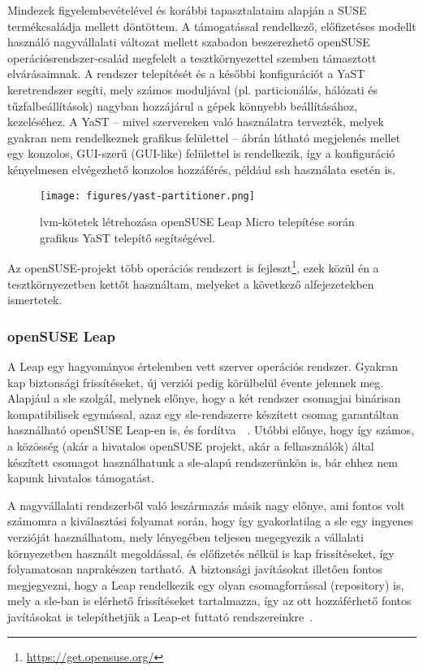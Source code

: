 Mindezek figyelembevételével és korábbi tapasztalataim alapján a SUSE termékcsaládja mellett döntöttem. A támogatással rendelkező, előfizetéses modellt használó nagyvállalati változat mellett szabadon beszerezhető openSUSE operációsrendszer-család megfelelt a tesztkörnyezettel szemben támasztott elvárásaimnak. A rendszer telepítését és a későbbi konfigurációt a YaST keretrendszer segíti, mely számos moduljával (pl. particionálás, hálózati és tűzfalbeállítások) nagyban hozzájárul a gépek könnyebb beállításához, kezeléséhez. A YaST -- mivel szervereken való használatra tervezték, melyek gyakran nem rendelkeznek grafikus felülettel --  ábrán látható megjelenés mellet egy konzolos, GUI-szerű (GUI-like) felülettel is rendelkezik, így a konfiguráció kényelmesen elvégezhető konzolos hozzáférés, például \acrshort{ssh} használata esetén is.

\begin{figure}[!ht]
	\centering
	\texttt{[image: figures/yast-partitioner.png]}
	\caption{\acrshort{lvm}-kötetek létrehozása openSUSE Leap Micro telepítése során grafikus YaST telepítő segítségével.}
	\label{fig:yast-partitioner}
\end{figure}

Az openSUSE-projekt több operációs rendszert is fejleszt\footnote{\url{https://get.opensuse.org/}}, ezek közül én a tesztkörnyezetben kettőt használtam, melyeket a következő alfejezetekben ismertetek.

\subsubsection{openSUSE Leap}
A Leap egy hagyományos értelemben vett szerver operációs rendszer. Gyakran kap biztonsági frissítéseket, új verziói pedig körülbelül évente jelennek meg. Alapjául a \acrlong{sle} szolgál, melynek előnye, hogy a két rendszer csomagjai binárisan kompatibilisek egymással, azaz egy \acrshort{sle}-rendszerre készített csomag garantáltan használható openSUSE Leap-en is, és fordítva~\cite{openSUSELeap15SP3intro}~\cite{SLE15SP3intro}. Utóbbi előnye, hogy így számos, a közösség (akár a hivatalos openSUSE projekt, akár a felhasználók) által készített csomagot használhatunk a \acrshort{sle}-alapú rendszerünkön is, bár ehhez nem kapunk hivatalos támogatást.

A nagyvállalati rendszerből való leszármazás másik nagy előnye, ami fontos volt számomra a kiválasztási folyamat során, hogy így gyakorlatilag a \acrlong{sle} egy ingyenes verzióját használhatom, mely lényegében teljesen megegyezik a vállalati környezetben használt megoldással, és előfizetés nélkül is kap frissítéseket, így folyamatosan naprakészen tartható. A biztonsági javításokat illetően fontos megjegyezni, hogy a Leap rendelkezik egy olyan csomagforrással (repository) is, mely a \acrlong{sle}-ban is elérhető frissítéseket tartalmazza, így az ott hozzáférhető fontos javításokat is telepíthetjük a Leap-et futtató rendszereinkre~\cite{openSUSELeapSLERepo}.


